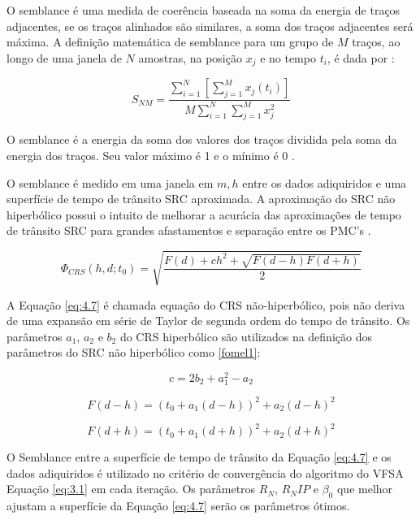 O semblance é uma medida de coerência baseada na soma da energia de traços adjacentes, se os traços alinhados são similares,
a soma dos traços adjacentes será máxima. A definição matemática de semblance para um grupo de $M$ traços, ao 
longo de uma janela de $N$ amostras, na posição $x_j$ e no tempo $t_i$, é dada por \cite{seg}:

\begin{equation}
\label{eq:2.17}
 S_{NM}=\frac{ \sum_{i=1}^N [\sum_{j=1}^M x_j(t_i)]}{M \sum_{i=1}^N \sum_{j=1}^Mx^2_{j}}
\end{equation}

O semblance é a energia da soma dos valores dos traços dividida pela soma da energia dos traços. 
Seu valor máximo é 1 e o mínimo é 0 \cite{seg}.

O semblance é medido em uma janela em $m, h$ entre os dados adiquiridos e uma superfície de tempo de
trânsito SRC aproximada. A aproximação do SRC não hiperbólico possui o
intuito de melhorar a acurácia das aproximações de tempo de trânsito SRC
para grandes afastamentos e separação entre os PMC's \cite{fomel1}.

\begin{equation}
\label{eq:4.7}
 \Phi_{CRS}(h,d;t_0)=\sqrt{\frac{F(d)+ch^2+\sqrt{F(d-h)F(d+h)}}{2}}
\end{equation}

A Equação \ref{eq:4.7} é chamada equação do CRS não-hiperbólico, pois não deriva de uma expansão em série de Taylor
de segunda ordem do tempo de trânsito. Os parâmetros 
$a_1$, $a_2$ e $b_2$
do CRS hiperbólico são utilizados na definição
dos parâmetros do SRC não hiperbólico como \ref{fomel1}:

\begin{equation}
\label{eq:4.8}
 c=2b_2+a_1^2-a_2
\end{equation}

\begin{equation}
\label{eq:4.9}
 F(d-h)=(t_0+a_1(d-h))^2+a_2(d-h)^2
\end{equation}

\begin{equation}
\label{eq:4.10}
 F(d+h)=(t_0+a_1(d+h))^2+a_2(d+h)^2
\end{equation}

O Semblance entre a superfície de tempo de trânsito da Equação \ref{eq:4.7} e os dados adiquiridos é utilizado no critério de
convergência do algoritmo do VFSA Equação \ref{eq:3.1} em cada iteração. Os parâmetros $R_N$, $R_NIP$ e $\beta_0$ que melhor
ajustam a superfície da Equação \ref{eq:4.7} serão os parâmetros ótimos.